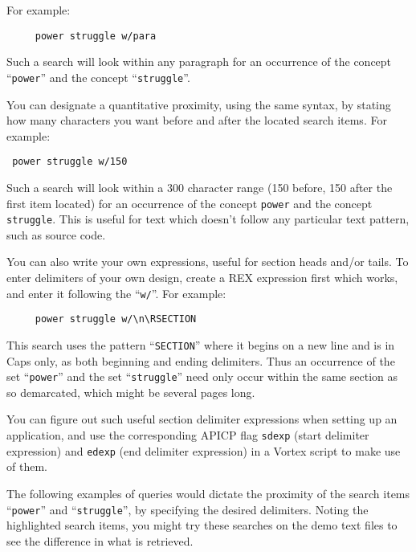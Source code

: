 For example:

\begin{verbatim}
     power struggle w/para
\end{verbatim}

Such a search will look within any paragraph for an occurrence of the
concept ``\verb`power`'' and the concept ``\verb`struggle`''.

You can designate a quantitative proximity, using the same syntax, by
stating how many characters you want before and after the located
search items.  For example:  \begin{verbatim} power struggle w/150
\end{verbatim} Such a search will look within a 300 character range
(150 before, 150 after the first item located) for an occurrence of
the concept \verb`power` and the concept \verb`struggle`.  This is
useful for text which doesn't follow any particular text pattern, such
as source code.

You can also write your own expressions, useful for section heads
and/or tails.  To enter delimiters of your own design, create a
REX expression first which works, and enter it following the
``\verb`w/`''.  For example:

\begin{verbatim}
     power struggle w/\n\RSECTION
\end{verbatim}

This search uses the pattern ``\verb`SECTION`'' where it begins on a
new line and is in Caps only, as both beginning and ending delimiters.
Thus an occurrence of the set ``\verb`power`'' and the set
``\verb`struggle`'' need only occur within the same section as so
demarcated, which might be several pages long.

You can figure out such useful section delimiter expressions when
setting up an application, and use the corresponding APICP flag
\verb`sdexp` (start delimiter expression) and \verb`edexp` (end
delimiter expression) in a Vortex script to make use of them.

The following examples of queries would dictate the proximity of the
search items ``\verb`power`'' and ``\verb`struggle`'', by specifying
the desired delimiters.  Noting the highlighted search items, you
might try these searches on the demo text files to see the difference
in what is retrieved.

